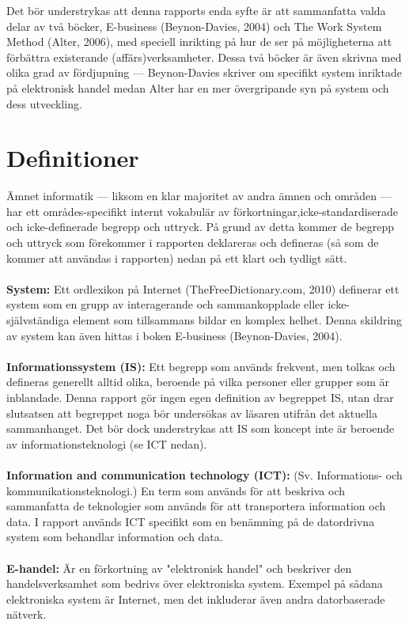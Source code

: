 \documentclass[12pt,a4paper,titlepage]{article}
\begin{document}
Det bör understrykas att denna rapports enda syfte är att sammanfatta valda delar av två böcker, E-business (Beynon-Davies, 2004) och The Work System Method (Alter, 2006), med speciell inrikting på hur de ser på möjligheterna att förbättra existerande (affärs)verksamheter. Dessa två böcker är även skrivna med olika grad av fördjupning --- Beynon-Davies skriver om specifikt system inriktade på elektronisk handel medan Alter har en mer övergripande syn på system och dess utveckling.

\section{\textsf{Definitioner}}
Ämnet informatik --- liksom en klar majoritet av andra ämnen och områden --- har ett områdes-specifikt internt vokabulär av förkortningar,icke-standardiserade och icke-definerade begrepp och uttryck. På grund av detta kommer de begrepp och uttryck som förekommer i rapporten deklareras och defineras (så som de kommer att användas i rapporten) nedan på ett klart och tydligt sätt.
\\
\\
\textbf{System:} Ett ordlexikon på Internet (TheFreeDictionary.com, 2010) definerar ett system som en grupp av interagerande och sammankopplade eller icke-självständiga element som tillsammans bildar en komplex helhet. Denna skildring av system kan även hittas i boken E-business (Beynon-Davies, 2004).
\\
\\
\textbf{Informationssystem (IS):} Ett begrepp som används frekvent, men tolkas och defineras generellt alltid olika, beroende på vilka personer eller grupper som är inblandade. Denna rapport gör ingen egen definition av begreppet IS, utan drar slutsatsen att begreppet noga bör undersökas av läsaren utifrån det aktuella sammanhanget. Det bör dock understrykas att IS som koncept inte är beroende av informationsteknologi (se ICT nedan).
\\
\\
\textbf{Information and communication technology (ICT):} (Sv. Informations- och kommunikationsteknologi.) En term som används för att beskriva och sammanfatta de teknologier som används för att transportera information och data. I rapport används ICT specifikt som en benämning på de datordrivna system som behandlar information och data.
\\
\\
\textbf{E-handel:} Är en förkortning av "elektronisk handel" och beskriver den handelsverksamhet som bedrivs över elektroniska system. Exempel på sådana elektroniska system är Internet, men det inkluderar även andra datorbaserade nätverk.
\end{document}
